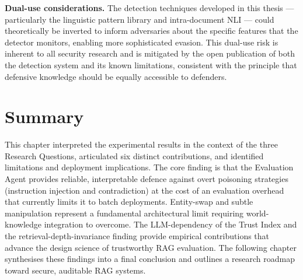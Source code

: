 \textbf{Dual-use considerations.} The detection techniques developed in this thesis --- particularly the linguistic pattern library and intra-document NLI --- could theoretically be inverted to inform adversaries about the specific features that the detector monitors, enabling more sophisticated evasion. This dual-use risk is inherent to all security research and is mitigated by the open publication of both the detection system and its known limitations, consistent with the principle that defensive knowledge should be equally accessible to defenders.

\section{Summary}
This chapter interpreted the experimental results in the context of the three Research Questions, articulated six distinct contributions, and identified limitations and deployment implications. The core finding is that the Evaluation Agent provides reliable, interpretable defence against overt poisoning strategies (instruction injection and contradiction) at the cost of an evaluation overhead that currently limits it to batch deployments. Entity-swap and subtle manipulation represent a fundamental architectural limit requiring world-knowledge integration to overcome. The LLM-dependency of the Trust Index and the retrieval-depth-invariance finding provide empirical contributions that advance the design science of trustworthy RAG evaluation. The following chapter synthesises these findings into a final conclusion and outlines a research roadmap toward secure, auditable RAG systems.
